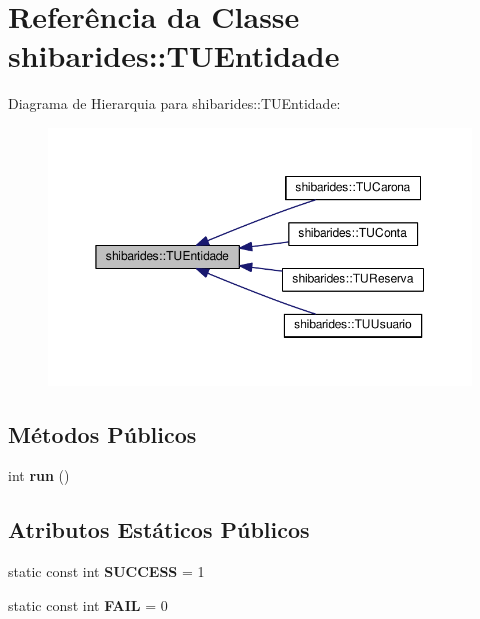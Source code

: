\hypertarget{classshibarides_1_1TUEntidade}{}\section{Referência da Classe shibarides\+:\+:T\+U\+Entidade}
\label{classshibarides_1_1TUEntidade}


Diagrama de Hierarquia para shibarides\+:\+:T\+U\+Entidade\+:\nopagebreak
\begin{figure}[H]
\begin{center}
\leavevmode
\includegraphics[width=350pt]{classshibarides_1_1TUEntidade__inherit__graph}
\end{center}
\end{figure}
\subsection*{Métodos Públicos}
\begin{DoxyCompactItemize}
\item 
int {\bfseries run} ()\hypertarget{classshibarides_1_1TUEntidade_a86646bd0263445275e009ae9e80758bc}{}\label{classshibarides_1_1TUEntidade_a86646bd0263445275e009ae9e80758bc}

\end{DoxyCompactItemize}
\subsection*{Atributos Estáticos Públicos}
\begin{DoxyCompactItemize}
\item 
static const int {\bfseries S\+U\+C\+C\+E\+SS} = 1\hypertarget{classshibarides_1_1TUEntidade_ab1f69b1700e2503ffaf55319cdac69dd}{}\label{classshibarides_1_1TUEntidade_ab1f69b1700e2503ffaf55319cdac69dd}

\item 
static const int {\bfseries F\+A\+IL} = 0\hypertarget{classshibarides_1_1TUEntidade_a8868068262635c3026d36ec91062545a}{}\label{classshibarides_1_1TUEntidade_a8868068262635c3026d36ec91062545a}

\end{DoxyCompactItemize}
